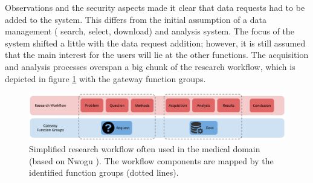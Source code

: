 Observations and the security aspects made it clear that data requests had to be added to the system.
This differs from the initial assumption of a data management (\eg{} search, select, download) and analysis system.
The focus of the system shifted a little with the data request addition; however, it is still assumed that the main interest for the users will lie at the other functions.
The acquisition and analysis processes overspan a big chunk of the research workflow, which is depicted in figure \ref{fig:research-workflow} with the gateway function groups.

\begin{figure}[h]
	\centering
	\includegraphics[width=1.0\linewidth]{images/research-workflow}
	\caption{
		Simplified research workflow often used  in the medical domain (based on Nwogu \cite{nwogu}).
		The workflow components are mapped  by the identified \ivfsystem{} function groups (dotted lines).
	}
	\label{fig:research-workflow}
\end{figure}